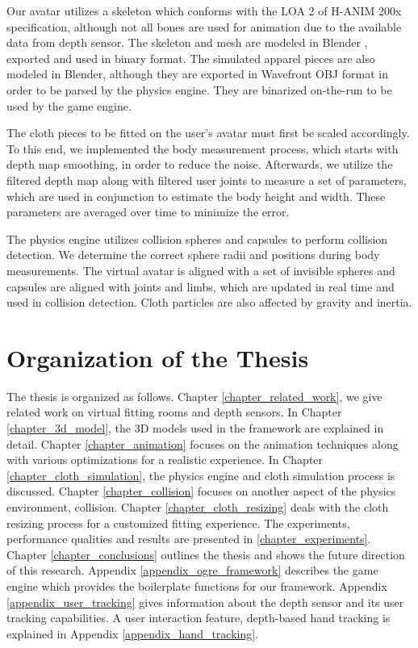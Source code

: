 Our avatar utilizes a skeleton which conforms with the LOA 2 of H-ANIM 200x specification\cite{HANIM}, although not all bones are used for 
animation due to the available data from depth sensor. The skeleton and mesh are modeled in Blender \cite{Blender}, exported and used in 
binary format. The simulated apparel pieces are also modeled in Blender, although they are exported in Wavefront OBJ format in order 
to be parsed by the physics engine. They are binarized on-the-run to be used by the game engine. 

The cloth pieces to be fitted on the user's avatar must first be scaled
accordingly. To this end, we implemented the body measurement process, 
which starts with depth map smoothing, in order to reduce the noise. 
Afterwards, we utilize the filtered depth map along with filtered
user joints to measure a set of parameters, which are used in conjunction
to estimate the body height and width. These parameters are averaged over 
time to minimize the error.

The physics engine utilizes collision spheres and capsules to perform
collision detection. We determine the correct sphere radii and positions 
during body measurements. The virtual avatar is aligned with a set of 
invisible spheres and capsules are aligned with joints and limbs, 
which are updated in real time and used in collision detection. 
Cloth particles are also affected by gravity and inertia.


\section{Organization of the Thesis}

The thesis is organized as follows. Chapter \ref{chapter_related_work}, we give related work on virtual fitting rooms and 
depth sensors. In Chapter \ref{chapter_3d_model}, the 3D models used in the framework are explained in detail. Chapter \ref{chapter_animation}
focuses on the animation techniques along with various optimizations for a realistic experience. In Chapter \ref{chapter_cloth_simulation}, the physics
engine and cloth simulation process is discussed. Chapter \ref{chapter_collision} focuses on another aspect of the physics environment, collision. 
Chapter \ref{chapter_cloth_resizing} deals with the cloth resizing process for a customized fitting experience. The experiments, performance qualities and 
results are presented in \ref{chapter_experiments}. Chapter \ref{chapter_conclusions} outlines the thesis and shows the future direction of this research.
Appendix \ref{appendix_ogre_framework} describes the game engine which provides the boilerplate functions for our framework. Appendix \ref{appendix_user_tracking}
gives information about the depth sensor and its user tracking capabilities. A user interaction feature, depth-based hand tracking is explained in Appendix \ref{appendix_hand_tracking}.
